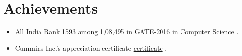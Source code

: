 \documentclass[a4paper,10pt]{article}
\begin{document}
	\section{Achievements}
	\begin{itemize}
		\item All India Rank 1593 among 1,08,495  in \href{https://drive.google.com/file/d/0B-2PYJZE99wQb1NCVHZFQjBsb0U/view}{GATE-2016} in Computer Science .
                \item Cummins Inc.’s appreciation certificate \href{https://drive.google.com/file/d/0B2kfGzkUmzWdbHJJZTRSLWJRVEE/view}{certificate} .
	\end{itemize}
\end{document}
